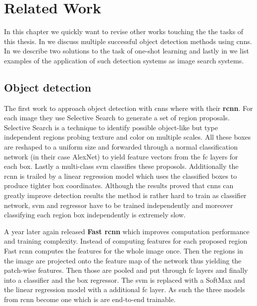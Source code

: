 %
\chapter{Related Work}
\label{sec:related}
In this chapter we quickly want to revise other works touching the the tasks of this thesis. In  we discuss multiple successful object detection methods using \glspl{cnn}. In  we describe two solutions to the task of one-shot learning and lastly in  we list examples of the application of such detection systems as image search systems.

\section{Object detection}
\label{sec:related:detection}
The first work to approach object detection with \glspl{cnn} where \citet{girshick_rich_2014} with their \textbf{\gls{rcnn}}. For each image they use Selective Search to generate a set of region proposals. Selective Search is a technique to identify possible object-like but type independent regions probing texture and color on multiple scales. All these boxes are reshaped to a uniform size and forwarded through a normal classification network (in their case AlexNet) to yield feature vectors from the \gls{fc} layers for each box. Lastly a multi-class \gls{svm} classifies these proposols. Additionally the \gls{rcnn} is trailed by a linear regression model which uses the classified boxes to produce tighter box coordinates. Although the results proved that \glspl{cnn} can greatly improve detection results the method is rather hard to train as classifier network, \gls{svm} and regressor have to be trained independently and moreover classifying each region box independently is extremely slow.

A year later again \citet{girshick_fast_2015} released \textbf{Fast \gls{rcnn}} which improves computation performance and training complexity. Instead of computing features for each proposed region Fast \gls{rcnn} computes the features for the whole image once. Then the regions in the image are projected onto the feature map of the network thus yielding the patch-wise features. Then those are pooled and put through \gls{fc} layers and finally into a classifier and the box regressor. The \gls{svm} is replaced with a SoftMax and the linear regression model with a additional \gls{fc} layer. As such the three models from \gls{rcnn} become one which is are end-to-end trainable.


